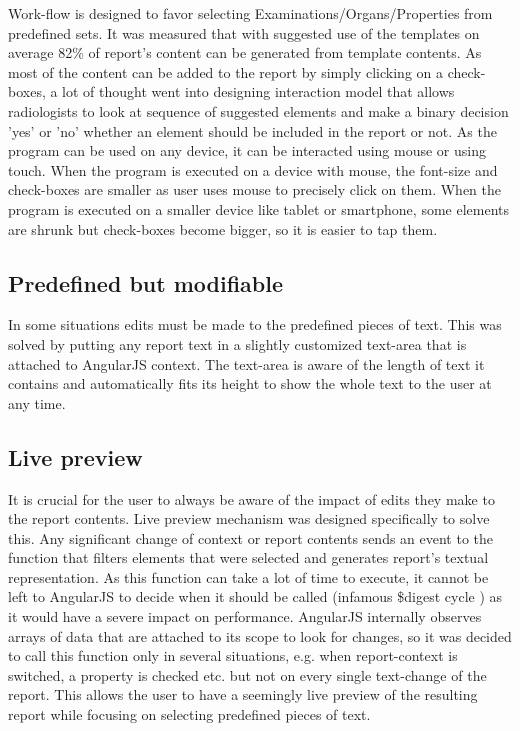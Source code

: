 \documentclass[12pt, twoside, openany]{report}
\theoremstyle{definition}
\begin{document}
Work-flow is designed to favor selecting Examinations/Organs/Properties from predefined sets. It was measured that with suggested use of the templates on average 82\% of report's content can be generated from template contents. As most of the content can be added to the report by simply clicking on a check-boxes, a lot of thought went into designing interaction model that allows radiologists to look at sequence of suggested elements and make a binary decision 'yes' or 'no' whether an element should be included in the report or not. 
As the program can be used on any device, it can be interacted using mouse or using touch. When the program is executed on a device with mouse, the font-size and check-boxes are smaller as user uses mouse to precisely click on them. When the program is executed on a smaller device like tablet or smartphone, some elements are shrunk but check-boxes become bigger, so it is easier to tap them. 

\subsection{Predefined but modifiable}
In some situations edits must be made to the predefined pieces of text. This was solved by putting any report text in a slightly customized text-area that is attached to AngularJS context. The text-area is aware of the length of text it contains and automatically fits its height to show the whole text to the user at any time.


\subsection{Live preview}\label{live-preview}
It is crucial for the user to always be aware of the impact of edits they make to the report contents. Live preview mechanism was designed specifically to solve this. Any significant change of context or report contents sends an event to the function that filters elements that were selected and generates report's textual representation. As this function can take a lot of time to execute, it cannot be left to AngularJS to decide when it should be called (infamous \$digest cycle \cite{angular-digest}) as it would have a severe impact on performance. AngularJS internally observes arrays of data that are attached to its scope to look for changes, so it was decided to call this function only in several situations, e.g. when report-context is switched, a property is checked etc. but not on every single text-change of the report. This allows the user to have a seemingly live preview of the resulting report while focusing on selecting predefined pieces of text.
\end{document}
